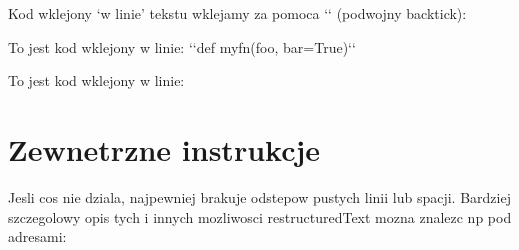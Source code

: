 \documentclass[letterpaper,10pt,english]{sphinxmanual}
\begin{document}
Kod wklejony ‘w linie’ tekstu wklejamy za pomoca {}`{}` (podwojny backtick):

\begin{sphinxVerbatim}[commandchars=\\\{\}]
To jest kod wklejony w linie: {}`{}`def my\PYGZus{}fn(foo, bar=True){}`{}`
\end{sphinxVerbatim}

To jest kod wklejony w linie: 


\section{Zewnetrzne instrukcje}
\label{\detokenize{tutorial:zewnetrzne-instrukcje}}
Jesli cos nie dziala, najpewniej brakuje odstepow pustych linii lub spacji.
Bardziej szczegolowy opis tych i innych mozliwosci restructuredText mozna znalezc np pod adresami:

\begin{DUlineblock}{0em}
\item[] 
\item[] 
\end{DUlineblock}



\renewcommand{\indexname}{Index}
\printindex
\end{document}
